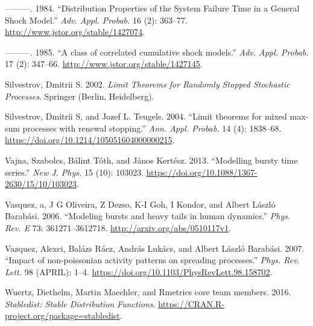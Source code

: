 \documentclass[]{elsarticle} %
\begin{document}
\leavevmode\hypertarget{ref-Sumita1984}{}%
---------. 1984. ``Distribution Properties of the System Failure Time in
a General Shock Model.'' \emph{Adv. Appl. Probab.} 16 (2): 363--77.
\url{http://www.jstor.org/stable/1427074}.

\leavevmode\hypertarget{ref-Sumita1985}{}%
---------. 1985. ``A class of correlated cumulative shock models.''
\emph{Adv. Appl. Probab.} 17 (2): 347--66.
\url{http://www.jstor.org/stable/1427145}.

\leavevmode\hypertarget{ref-Silvestrov2002a}{}%
Silvestrov, Dmitrii S. 2002. \emph{Limit Theorems for Randomly Stopped
Stochastic Processes}. Springer (Berlin, Heidelberg).

\leavevmode\hypertarget{ref-ST04}{}%
Silvestrov, Dmitrii S, and Jozef L. Teugels. 2004. ``Limit theorems for
mixed max-sum processes with renewal stopping.'' \emph{Ann. Appl.
Probab.} 14 (4): 1838--68.
\url{https://doi.org/10.1214/105051604000000215}.

\leavevmode\hypertarget{ref-Vajna2013}{}%
Vajna, Szabolcs, Bálint Tóth, and János Kertész. 2013. ``Modelling
bursty time series.'' \emph{New J. Phys.} 15 (10): 103023.
\url{https://doi.org/10.1088/1367-2630/15/10/103023}.

\leavevmode\hypertarget{ref-Vasquez2006}{}%
Vasquez, a, J G Oliveira, Z Dezso, K-I Goh, I Kondor, and Albert László
Barabási. 2006. ``Modeling bursts and heavy tails in human dynamics.''
\emph{Phys. Rev. E} 73: 361271--3612718.
\url{http://arxiv.org/abs/0510117v1}.

\leavevmode\hypertarget{ref-Vazquez2007}{}%
Vazquez, Alexei, Balázs Rácz, András Lukács, and Albert László Barabási.
2007. ``Impact of non-poissonian activity patterns on spreading
processes.'' \emph{Phys. Rev. Lett.} 98 (APRIL): 1--4.
\url{https://doi.org/10.1103/PhysRevLett.98.158702}.

\leavevmode\hypertarget{ref-stabledist}{}%
Wuertz, Diethelm, Martin Maechler, and Rmetrics core team members. 2016.
\emph{Stabledist: Stable Distribution Functions}.
\url{https://CRAN.R-project.org/package=stabledist}.
\end{document}
